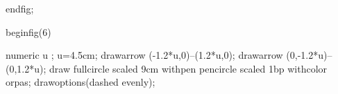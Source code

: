\documentclass[12pt]{article}
\begin{document}



 endfig;
 
 beginfig(6)



 numeric u ;
 u=4.5cm;
 drawarrow (-1.2*u,0)--(1.2*u,0);
 drawarrow (0,-1.2*u)--(0,1.2*u);
 draw fullcircle scaled 9cm withpen pencircle scaled 1bp withcolor orpas;
 drawoptions(dashed evenly);

\end{document}
